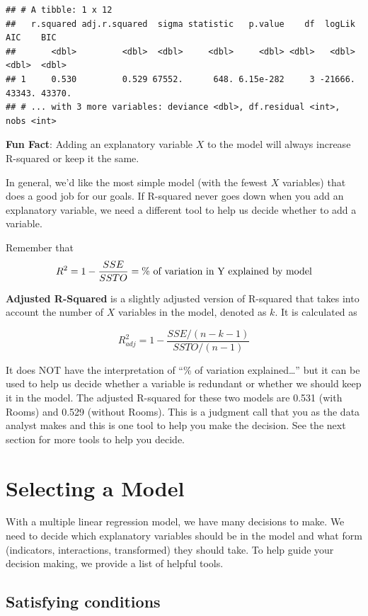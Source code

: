 \documentclass[
]{book}
\begin{document}
\begin{verbatim}
## # A tibble: 1 x 12
##   r.squared adj.r.squared  sigma statistic   p.value    df  logLik    AIC    BIC
##       <dbl>         <dbl>  <dbl>     <dbl>     <dbl> <dbl>   <dbl>  <dbl>  <dbl>
## 1     0.530         0.529 67552.      648. 6.15e-282     3 -21666. 43343. 43370.
## # ... with 3 more variables: deviance <dbl>, df.residual <int>, nobs <int>
\end{verbatim}

\textbf{Fun Fact}: Adding an explanatory variable \(X\) to the model will always increase R-squared or keep it the same.

In general, we'd like the most simple model (with the fewest \(X\) variables) that does a good job for our goals. If R-squared never goes down when you add an explanatory variable, we need a different tool to help us decide whether to add a variable.

Remember that
\[R^2 = 1 - \frac{SSE}{SSTO} = \%\hbox{ of variation in Y explained by model}\]

\textbf{Adjusted R-Squared} is a slightly adjusted version of R-squared that takes into account the number of \(X\) variables in the model, denoted as \(k\). It is calculated as

\[R^2_{adj} = 1 - \frac{SSE/(n-k-1)}{SSTO/(n-1)}\]

It does NOT have the interpretation of ``\% of variation explained\ldots{}'' but it can be used to help us decide whether a variable is redundant or whether we should keep it in the model. The adjusted R-squared for these two models are 0.531 (with Rooms) and 0.529 (without Rooms). This is a judgment call that you as the data analyst makes and this is one tool to help you make the decision. See the next section for more tools to help you decide.

\hypertarget{selecting-a-model}{%
\section{Selecting a Model}\label{selecting-a-model}}

With a multiple linear regression model, we have many decisions to make. We need to decide which explanatory variables should be in the model and what form (indicators, interactions, transformed) they should take. To help guide your decision making, we provide a list of helpful tools.

\hypertarget{satisfying-conditions}{%
\subsection{Satisfying conditions}\label{satisfying-conditions}}
\end{document}
